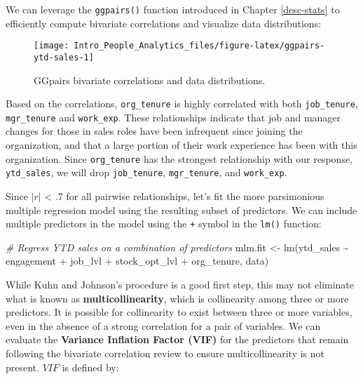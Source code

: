 \documentclass[
]{book}
\newenvironment{Shaded}{\begin{snugshade}}{\end{snugshade}}
\newcommand{\CommentTok}[1]{\textcolor[rgb]{0.56,0.35,0.01}{\textit{#1}}}
\newcommand{\FunctionTok}[1]{\textcolor[rgb]{0.00,0.00,0.00}{#1}}
\newcommand{\NormalTok}[1]{#1}
\newcommand{\OtherTok}[1]{\textcolor[rgb]{0.56,0.35,0.01}{#1}}
\newcommand{\SpecialCharTok}[1]{\textcolor[rgb]{0.00,0.00,0.00}{#1}}
\begin{document}
We can leverage the \texttt{ggpairs()} function introduced in Chapter \ref{desc-stats} to efficiently compute bivariate correlations and visualize data distributions:

\begin{figure}

{\centering \texttt{[image: Intro\_People\_Analytics\_files/figure-latex/ggpairs-ytd-sales-1]} 

}

\caption{GGpairs bivariate correlations and data distributions.}\label{fig:ggpairs-ytd-sales}
\end{figure}

Based on the correlations, \texttt{org\_tenure} is highly correlated with both \texttt{job\_tenure}, \texttt{mgr\_tenure} and \texttt{work\_exp}. These relationships indicate that job and manager changes for those in sales roles have been infrequent since joining the organization, and that a large portion of their work experience has been with this organization. Since \texttt{org\_tenure} has the strongest relationship with our response, \texttt{ytd\_sales}, we will drop \texttt{job\_tenure}, \texttt{mgr\_tenure}, and \texttt{work\_exp}.

Since \(|r|\) \textless{} .7 for all pairwise relationships, let's fit the more parsimonious multiple regression model using the resulting subset of predictors. We can include multiple predictors in the model using the \texttt{+} symbol in the \texttt{lm()} function:

\begin{Shaded}
\begin{Highlighting}[]
\CommentTok{\# Regress YTD sales on a combination of predictors}
\NormalTok{mlm.fit }\OtherTok{\textless{}{-}} \FunctionTok{lm}\NormalTok{(ytd\_sales }\SpecialCharTok{\textasciitilde{}}\NormalTok{ engagement }\SpecialCharTok{+}\NormalTok{ job\_lvl }\SpecialCharTok{+}\NormalTok{ stock\_opt\_lvl }\SpecialCharTok{+}\NormalTok{ org\_tenure, data)}
\end{Highlighting}
\end{Shaded}

While Kuhn and Johnson's procedure is a good first step, this may not eliminate what is known as \textbf{multicollinearity}, which is collinearity among three or more predictors. It is possible for collinearity to exist between three or more variables, even in the absence of a strong correlation for a pair of variables. We can evaluate the \textbf{Variance Inflation Factor (VIF)} for the predictors that remain following the bivariate correlation review to ensure multicollinearity is not present. \(VIF\) is defined by:
\end{document}
